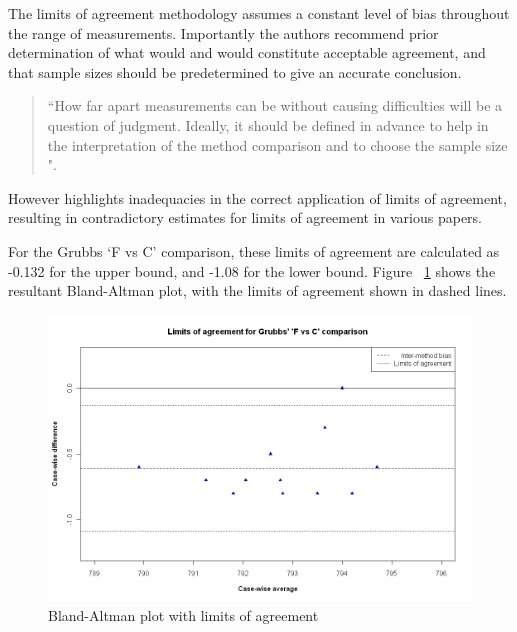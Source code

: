 \documentclass[12pt, a4paper]{report}
\theoremstyle{plain}
\theoremstyle{definition}
\theoremstyle{remark}
\begin{document}
The limits of agreement methodology assumes a constant level of bias throughout the range of measurements. Importantly the authors recommend prior determination of what would and would constitute acceptable
agreement, and that sample sizes should be predetermined to give an accurate conclusion. 

\begin{quote}
	``How far apart measurements can be without causing difficulties
	will be a question of judgment. Ideally, it should be defined in
	advance to help in the interpretation of the method comparison and
	to choose the sample size \citep{BA86}".
\end{quote}

However \citet{mantha} highlights inadequacies in the correct application of limits of agreement, resulting in contradictory estimates for limits of agreement in various papers.

For the Grubbs `F vs C' comparison, these limits
of agreement are calculated as -0.132 for the upper bound, and
-1.08 for the lower bound. Figure ~\ref{GrubbsBAplot-noLOA} shows the resultant
Bland-Altman plot, with the limits of agreement shown in dashed
lines.


\begin{figure}[h!]
	\begin{center}
		\includegraphics[width=125mm]{images/GrubbsBAplot-LOA.jpeg} 
		\caption{Bland-Altman plot with limits of agreement}
		\label{GrubbsBAplot-noLOA}
	\end{center}
\end{figure}
\newpage

\end{document}

